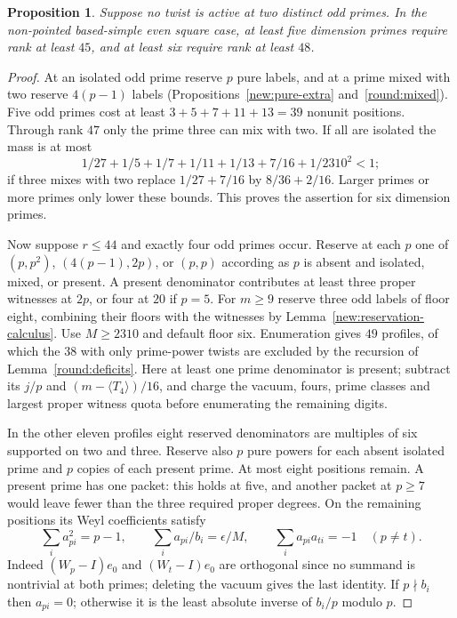 \documentclass[11pt]{amsart}
\numberwithin{equation}{section}
\newtheorem{proposition}[theorem]{Proposition}
\theoremstyle{definition}
\theoremstyle{plain}
\begin{document}
\begin{proposition}\label{sq:many-primes}
Suppose no twist is active at two distinct odd primes. In the
non-pointed based-simple even square case, at least five dimension
primes require rank at least $45$, and at least six require rank at least $48$.
\end{proposition}
\begin{proof}
At an isolated odd prime reserve $p$ pure labels, and at a prime
mixed with two reserve $4(p-1)$ labels
(Propositions~\ref{new:pure-extra} and~\ref{round:mixed}). Five odd
primes cost at least $3+5+7+11+13=39$ nonunit positions. Through
rank $47$ only the prime three can mix with two. If all are isolated the
mass is at most
\[
 1/27+1/5+1/7+1/11+1/13+7/16+1/2310^2<1;
\]
if three mixes with two replace $1/27+7/16$ by $8/36+2/16$.
Larger primes or more primes only lower these bounds. This proves
the assertion for six dimension primes.

Now suppose $r\le44$ and exactly four odd primes occur. Reserve at each $p$ one of $(p,p^2)$,
$(4(p-1),2p)$, or $(p,p)$ according as $p$ is absent and isolated,
mixed, or present. A present denominator contributes at least three
proper witnesses at $2p$, or four at $20$ if $p=5$. For $m\ge9$
reserve three odd labels of floor eight, combining their floors with
the witnesses by Lemma~\ref{new:reservation-calculus}.
Use $M\ge2310$ and default floor six. Enumeration gives $49$
profiles, of which the $38$ with only prime-power twists are excluded by the
recursion of Lemma~\ref{round:deficits}. Here at least one prime denominator
is present; subtract its $j/p$ and $(m-\langle T_4\rangle)/16$,
and charge the vacuum, fours, prime classes and largest proper
witness quota before enumerating the remaining digits.

In the other eleven profiles eight reserved denominators are multiples
of six supported on two and three. Reserve also $p$ pure powers
for each absent isolated prime and $p$ copies of each present prime.
At most eight positions remain. A present prime has one packet:
this holds at five, and another packet at $p\ge7$ would leave fewer
than the three required proper degrees. On the remaining positions
its Weyl coefficients satisfy
\[
 \sum_i a_{pi}^2=p-1,\qquad \sum_i a_{pi}/b_i=\epsilon/M,\qquad
 \sum_i a_{pi}a_{ti}=-1\quad(p\ne t).
\]
Indeed $(W_p-I)e_0$ and $(W_t-I)e_0$ are orthogonal since no summand
is nontrivial at both primes; deleting the vacuum gives the last
identity. If $p\nmid b_i$ then $a_{pi}=0$; otherwise it is the least
absolute inverse of $b_i/p$ modulo $p$.


\end{proof}
\end{document}
